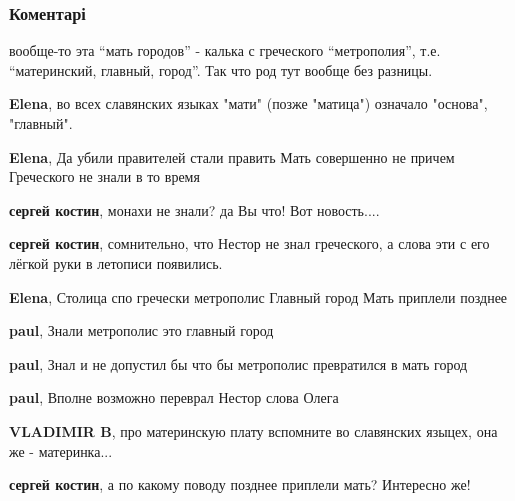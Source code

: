  
 
 
 
 
\subsubsection{Коментарі}
\label{sec:18_10_2021.yz.nealternativnaja_istoria.1.kiev_mti_gradom_ruskim.cmt}

\begin{itemize} %

вообще-то эта \enquote{мать городов} - калька с греческого \enquote{метрополия}, т.е.
\enquote{материнский, главный, город}. Так что род тут вообще без разницы.

\begin{itemize} %
\textbf{Elena}, во всех славянских языках "мати" (позже "матица") означало "основа", "главный".

\textbf{Elena}, Да убили правителей стали править Мать совершенно не причем Греческого не знали в то время

\textbf{сергей костин}, монахи не знали? да Вы что! Вот новость....

\textbf{сергей костин}, сомнительно, что Нестор не знал греческого, а слова эти с его лёгкой руки в летописи появились.

\textbf{Elena}, Столица спо гречески метрополис Главный город Мать приплели позднее

\textbf{paul}, Знали метрополис это главный город

\textbf{paul}, Знал и не допустил бы что бы метрополис превратился в мать город

\textbf{paul}, Вполне возможно переврал Нестор слова Олега

\textbf{VLADIMIR B}, про материнскую плату вспомните во славянских языцех, она же - материнка...

\textbf{сергей костин}, а по какому поводу позднее приплели мать? Интересно же!


\end{itemize}
\end{itemize}
